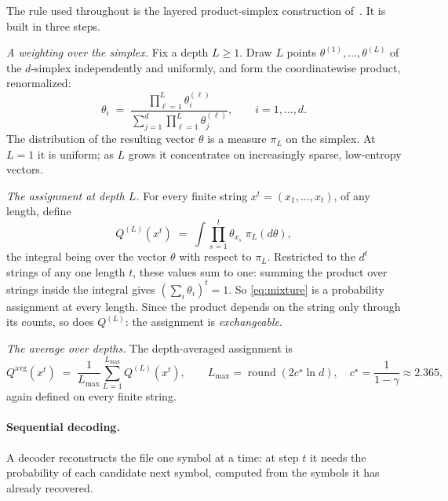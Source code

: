 \documentclass[11pt]{article}
\newcommand{\cstar}{c^\star}
\begin{document}
The rule used throughout is the layered product-simplex construction
of~\cite{layered2026}.  It is built in three steps.

\emph{A weighting over the simplex.}  Fix a depth $L \ge 1$.  Draw $L$
points $\theta^{(1)}, \dots, \theta^{(L)}$ of the $d$-simplex
independently and uniformly, and form the coordinatewise product,
renormalized:
\begin{equation}
\label{eq:product-prior}
  \theta_i \;=\;
  \frac{\prod_{\ell=1}^{L} \theta^{(\ell)}_i}
       {\sum_{j=1}^{d} \prod_{\ell=1}^{L} \theta^{(\ell)}_j},
  \qquad i = 1, \dots, d.
\end{equation}
The distribution of the resulting vector $\theta$ is a measure
$\pi_L$ on the simplex.  At $L=1$ it is uniform; as $L$ grows it
concentrates on increasingly sparse, low-entropy vectors.

\emph{The assignment at depth $L$.}  For every finite string
$x^t = (x_1, \dots, x_t)$, of any length, define
\begin{equation}
\label{eq:mixture}
  Q^{(L)}(x^t)
  \;=\;
  \int \prod_{s=1}^{t} \theta_{x_s} \; \pi_L(d\theta),
\end{equation}
the integral being over the vector $\theta$ with respect to $\pi_L$.
Restricted to the $d^t$ strings of any one length $t$, these values
sum to one: summing the product over strings inside the integral
gives $(\sum_i \theta_i)^t = 1$.  So \eqref{eq:mixture} is a
probability assignment at every length.  Since the product depends on
the string only through its counts, so does $Q^{(L)}$: the assignment
is \emph{exchangeable}.

\emph{The average over depths.}  The depth-averaged assignment is
\begin{equation}
\label{eq:depth-average}
  Q^{\mathrm{avg}}(x^t)
  \;=\;
  \frac{1}{L_{\max}}\sum_{L=1}^{L_{\max}} Q^{(L)}(x^t),
  \qquad
  L_{\max}=\operatorname{round}(2\cstar\ln d),
  \quad
  \cstar=\frac{1}{1-\gamma}\approx 2.365,
\end{equation}
again defined on every finite string.

\paragraph{Sequential decoding.}  A decoder reconstructs the file one
symbol at a time: at step $t$ it needs the probability of each
candidate next symbol, computed from the symbols it has already
recovered.
\end{document}
